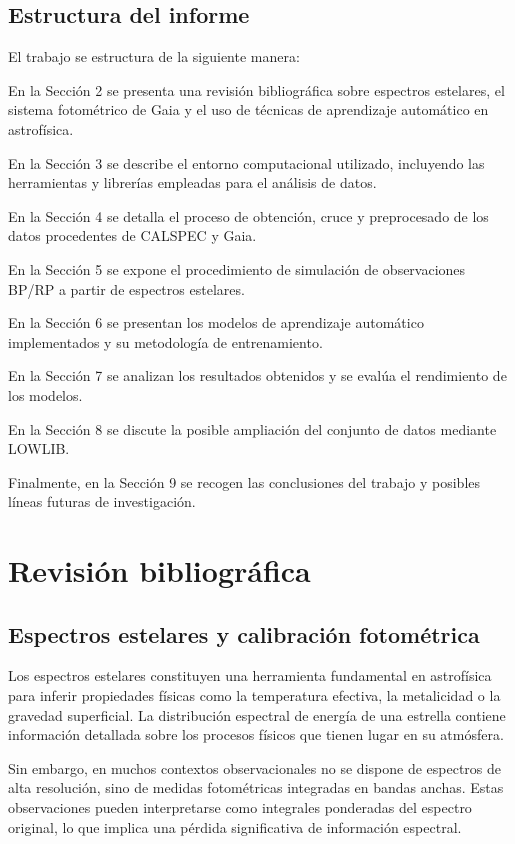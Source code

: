 \documentclass{article}
\begin{document}
\subsection{Estructura del informe}
El trabajo se estructura de la siguiente manera:

En la Sección 2 se presenta una revisión bibliográfica sobre espectros estelares, el sistema fotométrico de Gaia y el uso de técnicas de aprendizaje automático en astrofísica. 

En la Sección 3 se describe el entorno computacional utilizado, incluyendo las herramientas y librerías empleadas para el análisis de datos. 

En la Sección 4 se detalla el proceso de obtención, cruce y preprocesado de los datos procedentes de CALSPEC y Gaia. 

En la Sección 5 se expone el procedimiento de simulación de observaciones BP/RP a partir de espectros estelares.

En la Sección 6 se presentan los modelos de aprendizaje automático implementados y su metodología de entrenamiento.

En la Sección 7 se analizan los resultados obtenidos y se evalúa el rendimiento de los modelos.

En la Sección 8 se discute la posible ampliación del conjunto de datos mediante LOWLIB.

Finalmente, en la Sección 9 se recogen las conclusiones del trabajo y posibles líneas futuras de investigación.


\newpage
\section{Revisión bibliográfica}

\subsection{Espectros estelares y calibración fotométrica}

Los espectros estelares constituyen una herramienta fundamental en astrofísica para inferir propiedades físicas como la temperatura efectiva, la metalicidad o la gravedad superficial. La distribución espectral de energía de una estrella contiene información detallada sobre los procesos físicos que tienen lugar en su atmósfera.

Sin embargo, en muchos contextos observacionales no se dispone de espectros de alta resolución, sino de medidas fotométricas integradas en bandas anchas. Estas observaciones pueden interpretarse como integrales ponderadas del espectro original, lo que implica una pérdida significativa de información espectral.
\end{document}
